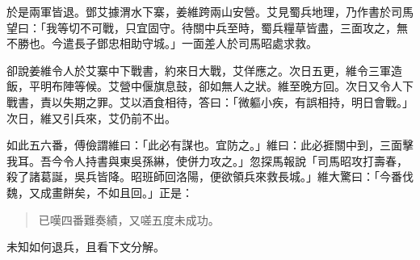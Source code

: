 於是兩軍皆退。鄧艾據渭水下寨，姜維跨兩山安營。艾見蜀兵地理，乃作書於司馬望曰：「我等切不可戰，只宜固守。待關中兵至時，蜀兵糧草皆盡，三面攻之，無不勝也。今遣長子鄧忠相助守城。」一面差人於司馬昭處求救。

卻說姜維令人於艾寨中下戰書，約來日大戰，艾佯應之。次日五更，維令三軍造飯，平明布陣等候。艾營中偃旗息鼓，卻如無人之狀。維至晚方回。次日又令人下戰書，責以失期之罪。艾以酒食相待，答曰：「微軀小疾，有誤相持，明日會戰。」次日，維又引兵來，艾仍前不出。

如此五六番，傅儉謂維曰：「此必有謀也。宜防之。」維曰：此必捱關中到，三面擊我耳。吾今令人持書與東吳孫綝，使併力攻之。」忽探馬報說「司馬昭攻打壽春，殺了諸葛誕，吳兵皆降。昭班師回洛陽，便欲領兵來救長城。」維大驚曰：「今番伐魏，又成畫餅矣，不如且回。」正是：

\begin{quote}
已嘆四番難奏績，又嗟五度未成功。
\end{quote}

未知如何退兵，且看下文分解。
